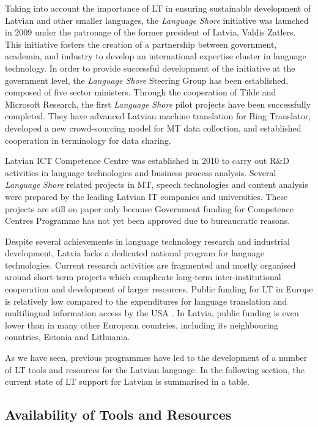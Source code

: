 \begin{multicols}{2}
Taking into account the importance of LT in ensuring sustainable development of Latvian and other smaller languages, the \textit{Language Shore} initiative was launched in 2009 under the patronage of the former president of Latvia, Valdis Zatlers.
This initiative fosters the creation of a partnership between government, academia, and industry to develop an international expertise cluster in language technology.
In order to provide successful development of the initiative at the government level, the \textit{Language Shore} Steering Group has been established, composed of five sector ministers.
Through the cooperation of Tilde and Microsoft Research, the first \textit{Language Shore} pilot projects have been successfully completed.
They have advanced Latvian machine translation for Bing Translator, developed a new crowd-sourcing model for MT data collection, and established cooperation in terminology for data sharing. 

Latvian ICT Competence Centre was established in 2010 to carry out R\&D activities in language technologies and business process analysis.
Several \textit{Language Shore} related projects in MT, speech technologies and content analysis were prepared by the leading Latvian IT companies and universities.
These projects are still on paper only because Government funding for Competence Centres Programme has not yet been approved due to bureaucratic reasons.

Despite several achievements in language technology research and industrial development, Latvia lacks a dedicated national program for language technologies.
Current research activities are fragmented and mostly organised around short-term projects which complicate long-term inter-institutional cooperation and development of larger resources.
Public funding for LT in Europe is relatively low compared to the expenditures for language translation and multilingual information access by the USA \cite{Meta46}.
In Latvia, public funding is even lower than in many other European countries, including its neighbouring countries, Estonia and Lithuania.

As we have seen, previous programmes have led to the development of a number of LT tools and resources for the Latvian language.
In the following section, the current state of LT support for Latvian is summarised in a table. 

\subsection{Availability of Tools and Resources}


\end{multicols}

